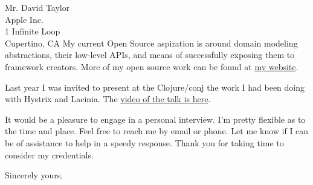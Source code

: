 \documentclass{letter} %
\begin{document}
\begin{letter}{Mr. David Taylor \\
Apple Inc. \\
1 Infinite Loop \\
Cupertino, CA}
\noindent My current Open Source aspiration is around domain modeling
abstractions, their low-level APIs, and means of successfully exposing them to
framework creators. More of my open source work can be found at
\href{https://luchini.nyc}{my website}.

\noindent Last year I was invited to present at the Clojure/conj the work I had
been doing with Hystrix and Lacinia. The
\href{https://github.com/luchiniatwork/conj2017}{video of the talk is here}.

\noindent It would be a pleasure to engage in a personal interview. I'm pretty
flexible as to the time and place. Feel free to reach me by email or phone. Let
me know if I can be of assistance to help in a speedy response. Thank you for
taking time to consider my credentials.
 
\closing{Sincerely yours,}



\end{letter}
\end{document}
